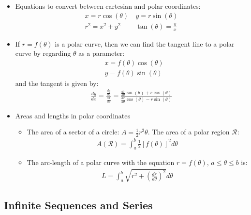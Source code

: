 \documentclass[11pt]{article}
\begin{document}
\begin{itemize}
\begin{itemize}[noitemsep]
	\end{itemize}
	\item Equations to convert between cartesian and polar coordinates: 
	\begin{align}
		x = r \cos (\theta)\ & y = r \sin (\theta) \\
		r^2 = x^2 + y^2\ & \tan ( \theta) = \frac{y}{x}	
	\end{align}
	\item If $r = f(\theta)$ is a polar curve, then we can find the tangent line to a polar curve by regarding $\theta$ as a parameter: 
	\begin{align*}
			& x = f(\theta) \cos ( \theta) \\
			& y = f(\theta) \sin ( \theta) 
	\end{align*}
	and the tangent is given by: 
	\begin{align}
		\frac{dy}{dx} = \frac{\frac{dy}{d \theta}}{\frac{dx}{d \theta}} = \frac{\frac{dr}{d \theta} \sin (\theta) + r \cos ( \theta)}{\frac{dr}{d \theta} \cos ( \theta) - r \sin (\theta)}
	\end{align}
	\item Areas and lengths in polar coordinates
	\begin{itemize}[noitemsep]
		\item The area of a sector of a circle: $A = \frac{1}{2} r^2 \theta$. The area of a polar region $\mathcal{R}$: 
		\begin{align}
			A(\mathcal{R}) = \int_a^b \frac{1}{2} [ f(\theta) ]^2 d \theta 
		\end{align}
		\item The arc-length of a polar curve with the equation $r = f( \theta)$, $ a \leq \theta \leq b$ is: 
		\begin{align}
			L = \int_a^b \sqrt{r^2 + \left( \frac{dr}{d \theta} \right)^2} d \theta 	
		\end{align}
	\end{itemize}
\end{itemize}

\subsection{Infinite Sequences and Series}
\end{document}
